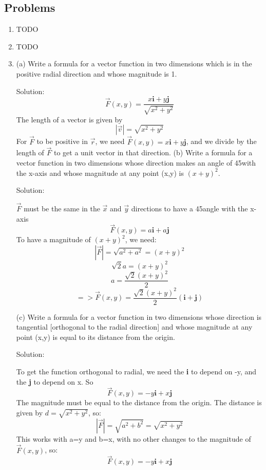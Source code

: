 \documentclass{article}
\begin{document}
\subsection*{Problems}
\begin{enumerate}
    \item TODO
    \item TODO
    \item
    (a) Write a formula for a vector function
    in two dimensions which is in the positive radial direction
    and whose magnitude is 1.

    Solution:
    \[ \vec{F}(x, y) = \frac{x\textbf{i} + y\textbf{j}}
    {\sqrt{x^2 + y^2}} \]
    The length of a vector is given by
    \[ |\vec{v}| =  \sqrt{x^2 + y^2} \]
    For $\vec{F}$ to be positive in $\vec{r}$, we need
    $\vec{F}(x,y) = x\textbf{i} + y\textbf{j}$, and we divide
    by the length of $\vec{F}$ to get a unit vector in that direction.
    \newline
    \newline
    (b) Write a formula for a vector function in two dimensions
    whose direction makes an angle of 45\degree with the x-axis and whose magnitude
    at any point (x,y) is $(x + y)^2$.

    Solution:

    $\vec{F}$ must be the same in the $\vec{x}$ and $\vec{y}$ directions
    to have a 45\degree angle with the x-axis
    \[ \vec{F}(x, y) = a\textbf{i} + a\textbf{j}\]
    To have a magnitude of $(x + y)^2$, we need:
    \[ |\vec{F}| = \sqrt{a^2 + a^2} = (x + y)^2 \]
    \[ \sqrt{2}a = (x + y)^2 \]
    \[ a = \frac{\sqrt{2}(x + y)^2}{2} \]
    \[ => \vec{F}(x,y) = \frac{\sqrt{2}(x+y)^2}{2}(\textbf{i} + \textbf{j}) \]

    (c) Write a formula for a vector function in two dimensions
    whose direction is tangential [orthogonal to the radial direction] and
    whose magnitude at any point (x,y) is equal to its distance
    from the origin.

    Solution:

    To get the function orthogonal to radial, we need the \textbf{i}
    to depend on -y, and the \textbf{j} to depend on
    x. So
    \[ \vec{F}(x,y) = -y\textbf{i} + x\textbf{j} \]
    The magnitude must be equal to the distance from the origin. The distance
    is given by $d=\sqrt{x^2+y^2}$, so:
    \[ |\vec{F}| = \sqrt{a^2+b^2} = \sqrt{x^2+y^2} \]
    This works with a=y and b=x, with no other changes to the
    magnitude of $\vec{F}(x,y)$, so:
    \[ \vec{F}(x,y) = -y\textbf{i} + x\textbf{j} \]


\end{enumerate}
\end{document}
